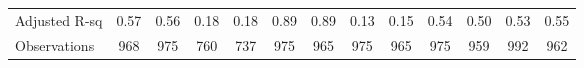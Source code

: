 {\begin{tabular}{l*{12}{c}}
Adjusted R-sq       &        0.57         &        0.56         &        0.18         &        0.18         &        0.89         &        0.89         &        0.13         &        0.15         &        0.54         &        0.50         &        0.53         &        0.55         \\
Observations        &         968         &         975         &         760         &         737         &         975         &         965         &         975         &         965         &         975         &         959         &         992         &         962         \\
\hline\hline
\end{tabular}
}
